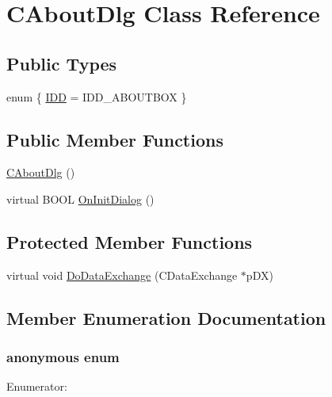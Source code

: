 \hypertarget{classCAboutDlg}{
\section{CAboutDlg Class Reference}
\label{classCAboutDlg}
}
\subsection*{Public Types}
\begin{DoxyCompactItemize}
\item 
enum \{ \hyperlink{classCAboutDlg_a9b3dffd380e223f02797602ed2144860ab6703c7538518b2b788243189e9f7981}{IDD} =  IDD\_\-ABOUTBOX
 \}
\end{DoxyCompactItemize}
\subsection*{Public Member Functions}
\begin{DoxyCompactItemize}
\item 
\hyperlink{classCAboutDlg_a6d1e6a33fef23bee6e75254189d865ce}{CAboutDlg} ()
\item 
virtual BOOL \hyperlink{classCAboutDlg_ac000be71252e280b53886db326fd739f}{OnInitDialog} ()
\end{DoxyCompactItemize}
\subsection*{Protected Member Functions}
\begin{DoxyCompactItemize}
\item 
virtual void \hyperlink{classCAboutDlg_ab83db7484fec957282d7d5a21aed4df4}{DoDataExchange} (CDataExchange $\ast$pDX)
\end{DoxyCompactItemize}


\subsection{Member Enumeration Documentation}
\hypertarget{classCAboutDlg_a9b3dffd380e223f02797602ed2144860}{
\subsubsection[{"@10}]{\setlength{\rightskip}{0pt plus 5cm}anonymous enum}}
\label{classCAboutDlg_a9b3dffd380e223f02797602ed2144860}
\begin{Desc}
\item[Enumerator: ]\par
\begin{description}
\item[{\em 
\hypertarget{classCAboutDlg_a9b3dffd380e223f02797602ed2144860ab6703c7538518b2b788243189e9f7981}{
IDD}
\label{classCAboutDlg_a9b3dffd380e223f02797602ed2144860ab6703c7538518b2b788243189e9f7981}
}]\end{description}
\end{Desc}



